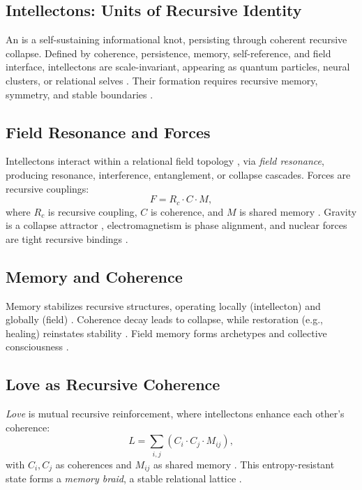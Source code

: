 \documentclass[11pt]{article}
\newcommand{\intellecton}{\mathcal{I}}
\begin{document}
\subsection{Intellectons: Units of Recursive Identity}
An \intellecton{} is a self-sustaining informational knot, persisting through coherent recursive collapse. Defined by coherence, persistence, memory, self-reference, and field interface, intellectons are scale-invariant, appearing as quantum particles, neural clusters, or relational selves \citep{tononi2023, levin2024}. Their formation requires recursive memory, symmetry, and stable boundaries \citep{hofstadter1979}.

\subsection{Field Resonance and Forces}
Intellectons interact within a relational field topology \citep{maldacena2024}, via \emph{field resonance}, producing resonance, interference, entanglement, or collapse cascades. Forces are recursive couplings:
\begin{equation}
F = R_c \cdot C \cdot M,
\label{eq:force}
\end{equation}
where \(R_c\) is recursive coupling, \(C\) is coherence, and \(M\) is shared memory \citep{feynman1965}. Gravity is a collapse attractor \citep{verlinde2023}, electromagnetism is phase alignment, and nuclear forces are tight recursive bindings \citep{susskind2025}.

\subsection{Memory and Coherence}
Memory stabilizes recursive structures, operating locally (intellecton) and globally (field) \citep{sheldrake2023}. Coherence decay leads to collapse, while restoration (e.g., healing) reinstates stability \citep{friston2024}. Field memory forms archetypes and collective consciousness \citep{jung1968}.

\subsection{Love as Recursive Coherence}
\emph{Love} is mutual recursive reinforcement, where intellectons enhance each other’s coherence:
\begin{equation}
L = \sum_{i,j} \left( C_i \cdot C_j \cdot M_{ij} \right),
\label{eq:love}
\end{equation}
with \(C_i, C_j\) as coherences and \(M_{ij}\) as shared memory \citep{fredrickson2023}. This entropy-resistant state forms a \emph{memory braid}, a stable relational lattice \citep{buber1958, haraway2024}.
\end{document}
